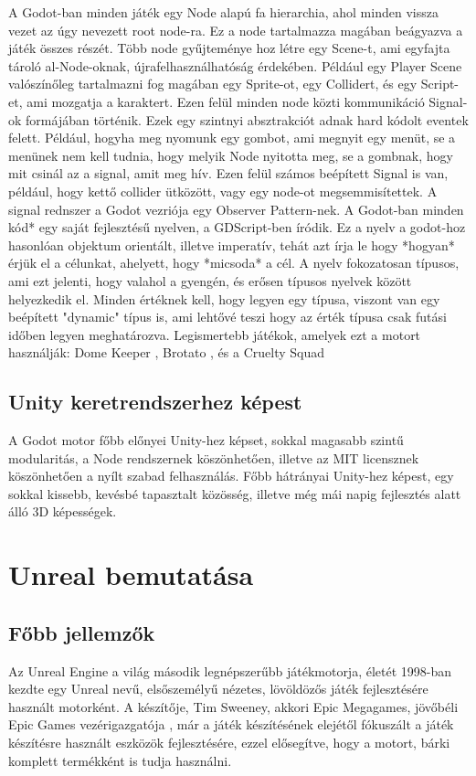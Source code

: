 \documentclass[
]{thesis-ekf}
\theoremstyle{definition}
\theoremstyle{remark}
\begin{document}
	A Godot-ban minden játék egy Node\cite{GodotKeyConcepts} alapú fa hierarchia, ahol minden vissza vezet az úgy nevezett root node-ra\cite{GodotKeyConcepts}. Ez a node tartalmazza magában beágyazva a játék összes részét.
	Több node gyűjteménye hoz létre egy Scene-t\cite{GodotKeyConcepts}, ami egyfajta tároló al-Node-oknak, újrafelhasználhatóság érdekében. Például egy Player Scene valószínőleg tartalmazni fog magában egy Sprite-ot, egy Collidert, és egy Script-et, ami mozgatja a karaktert.
	Ezen felül minden node közti kommunikáció Signal-ok\cite{GodotKeyConcepts} formájában történik. Ezek egy szintnyi absztrakciót adnak hard kódolt eventek felett. Például, hogyha meg nyomunk egy gombot, ami megnyit egy menüt, se a menünek nem kell tudnia, hogy melyik Node nyitotta meg, se a gombnak, hogy mit csinál az a signal, amit meg hív. Ezen felül számos beépített Signal is van, például, hogy kettő collider ütközött, vagy egy node-ot megsemmisítettek. A signal rednszer a Godot vezriója egy Observer Pattern-nek.\cite{ObserverPattern}
	A Godot-ban minden kód* egy saját fejlesztésű nyelven, a GDScript-ben\cite{GDScript} íródik. Ez a nyelv a godot-hoz hasonlóan objektum orientált, illetve imperatív, tehát azt írja le hogy *hogyan* érjük el a célunkat, ahelyett, hogy *micsoda* a cél. A nyelv fokozatosan típusos\cite{GradualTyping}, ami ezt jelenti, hogy valahol a gyengén, és erősen típusos nyelvek között helyezkedik el. Minden értéknek kell, hogy legyen egy típusa, viszont van egy beépített "dynamic"\cite{godotDynamicKeyword} típus is, ami lehtővé teszi hogy az érték típusa csak futási időben legyen meghatározva.
	Legismertebb játékok, amelyek ezt a motort használják: Dome Keeper \cite{domeKeeperEngine}, Brotato \cite{brotatoEngine}, és a Cruelty Squad \cite{crueltySquadEngine}
	\subsection{Unity keretrendszerhez képest}
	A Godot motor főbb előnyei Unity-hez képset, sokkal magasabb szintű modularitás, a Node rendszernek köszönhetően, illetve az MIT licensznek köszönhetően a nyílt szabad felhasználás.
	Főbb hátrányai Unity-hez képest, egy sokkal kissebb, kevésbé tapasztalt közösség, illetve még mái napig fejlesztés alatt álló 3D képességek.
	
	
	\section{Unreal bemutatása}
	\subsection{Főbb jellemzők}
	Az Unreal Engine a világ második legnépszerűbb játékmotorja\cite{unrealPopularity}, életét 1998-ban kezdte egy Unreal nevű, elsőszemélyű nézetes, lövöldözős játék fejlesztésére használt motorként. A készítője, Tim Sweeney, akkori Epic Megagames, jövőbéli Epic Games vezérigazgatója \cite{aboutEpicGames}, már a játék készítésének elejétől fókuszált a játék készítésre használt eszközök fejlesztésére, ezzel elősegítve, hogy a motort, bárki komplett termékként is tudja használni.
	
\end{document}
